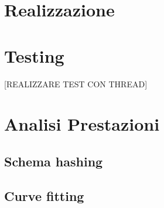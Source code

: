 \section{Realizzazione}


\section{Testing}

	
	[REALIZZARE TEST CON THREAD]

\section{Analisi Prestazioni}

	
	\subsection{Schema hashing}
	
		
	\subsection{Curve fitting}
	
